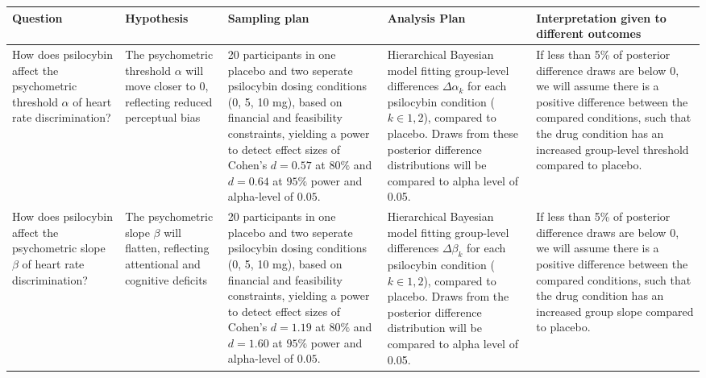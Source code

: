 \documentclass{article}
\begin{document}
\begin{adjustbox}{center, caption={Design Table},float=table}
\scriptsize
\begin{tabular}{| m{} | m{} | m{} | m{} | m{} |} 
 \hline
Question&Hypothesis&Sampling plan&Analysis Plan&Interpretation given to different outcomes \\
 \hline\hline
How does psilocybin affect the psychometric threshold $\alpha$ of heart rate discrimination?&The psychometric threshold $\alpha$ will move closer to 0, reflecting reduced perceptual bias&20 participants in one placebo and two seperate psilocybin dosing conditions (0, 5, 10 mg), based on financial and feasibility constraints, yielding a power to detect effect sizes of Cohen's $d = 0.57$ at $80\%$ and $d = 0.64$ at $95\%$ power and alpha-level of $0.05$.&Hierarchical Bayesian model fitting group-level differences $\Delta\alpha_{k}$ for each psilocybin condition ($k \in {1, 2}$), compared to placebo. Draws from these posterior difference distributions will be compared to alpha level of 0.05.&If less than 5\% of posterior difference draws are below 0, we will assume there is a positive difference between the compared conditions, such that the drug condition has an increased group-level threshold compared to placebo.\\ \hline
How does psilocybin affect the psychometric slope $\beta$ of heart rate discrimination?&The psychometric slope $\beta$ will flatten, reflecting attentional and cognitive deficits&20 participants in one placebo and two seperate psilocybin dosing conditions (0, 5, 10 mg), based on financial and feasibility constraints, yielding a power to detect effect sizes of Cohen's $d = 1.19$ at $80\%$ and $d = 1.60$ at $95\%$ power and alpha-level of $0.05$.&Hierarchical Bayesian model fitting group-level differences $\Delta\beta_{k}$ for each psilocybin condition ($k \in {1, 2}$), compared to placebo. Draws from the posterior difference distribution will be compared to alpha level of 0.05.&If less than 5\% of posterior difference draws are below 0, we will assume there is a positive difference between the compared conditions, such that the drug condition has an increased group slope compared to placebo. \\ \hline
\end{tabular}\label{design_table}
\end{adjustbox}

\end{document}
